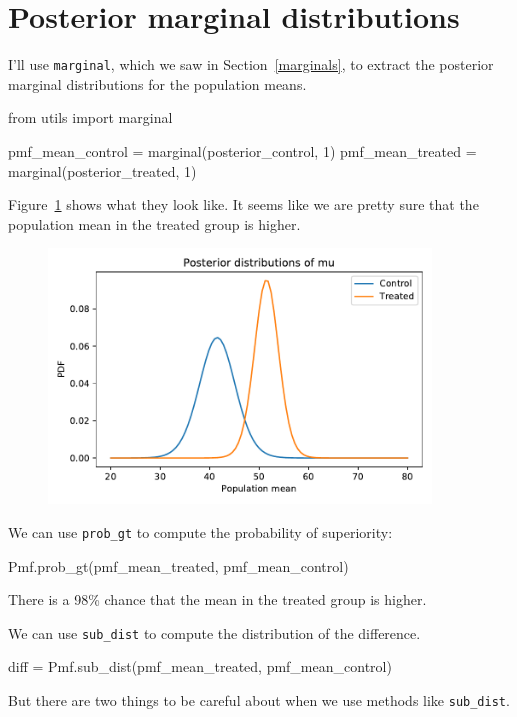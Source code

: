 \documentclass[12pt]{book}
\theoremstyle{exercise}
\newcommand{\py}[1]{{\tt #1}}%
\begin{document}
\section{Posterior marginal distributions}

I'll use \py{marginal}, which we saw in Section~\ref{marginals},
to extract the posterior marginal distributions for the population means.

\begin{code}
from utils import marginal

pmf_mean_control = marginal(posterior_control, 1)
pmf_mean_treated = marginal(posterior_treated, 1)
\end{code}

Figure~\ref{fig11-03} shows what they look like.
It seems like we are pretty sure that the population mean in the treated
group is higher.

\begin{figure}
\centerline{\includegraphics[width=4in]{figs/fig11-03.pdf}}
\caption{}
\label{fig11-03}
\end{figure}

We can use \py{prob_gt} to
compute the probability of superiority:

\begin{code}
Pmf.prob_gt(pmf_mean_treated, pmf_mean_control)
\end{code}

There is a 98\% chance that the mean in the treated group is higher.

We can use \py{sub_dist} to compute the
distribution of the difference.

\begin{code}
diff = Pmf.sub_dist(pmf_mean_treated, pmf_mean_control)
\end{code}

But there are two things to be careful about when we use methods like
\py{sub_dist}.
\end{document}

